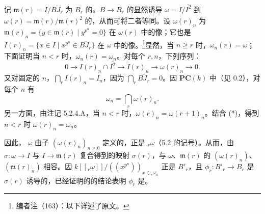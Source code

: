 记 $\mathfrak m(r)=I/\overline{BJ_r}$ 为 $B_r$ 的。$B\to B_r$ 的显然诱导 $\omega=I/\overline{I^2}$ 到 $\omega(r)=\mathfrak m(r)/\overline{\mathfrak m(r)^2}$ 的，从而可将二者等同。设 $\omega(r)_n$ 为 $\mathfrak m(r)_n=\{y\in\mathfrak m(r)\mid y^{p^n}=0\}$ 在 $\omega(r)$ 中的像；它也是
$I(r)_n=\{x\in I\mid x^{p^n}\in\overline{BJ_r}\}$ 在 $\omega$ 中的像。\footnote{编者注（163）：以下详述了原文。}显然，当 $n\geq r$ 时，$\omega_n(r)=\omega$；下面证明当 $n<r$ 时，$\omega_n(r)=\omega_n$。对每个 $r,n$，下列序列：
\[0\longrightarrow I(r)_n\cap\overline{I^2}\longrightarrow I(r)_n\longrightarrow\omega(r)_n\longrightarrow0.\]
又对固定的 $n$，$\bigcap_rI(r)_n=I_n$，因为 $\bigcap_r\overline{BJ_r}=0$。因 $\mathbf{PC}(k)$ 中（见 0.2），对每个 $n$ 有
\[\omega_n=\bigcap_r\omega(r)_n.\tag{*}\]
另一方面，由注记 5.2.4.A，当 $n<r$ 时，$\omega(r)_n=\omega(r+1)_n$。结合 (*)，得到 $n<r$ 时 $\omega(r)_n=\omega_n$。

因此， $\omega$ 由子 $(\omega(r)_n)_{n\geq0}$ 定义的，正是 ${}_r\omega$（5.2 的记号）。从而，由 $\sigma:\omega\to I$ 与 $I\to\mathfrak m(r)$ 复合得到的映射 $\sigma(r)$，与 $\omega$、$\mathfrak m(r)$ 的 $(\omega(r)_n)$、$(\mathfrak m(r)_n)$ 相容。因 $k[[{}_r\omega]]/((x^{p^n}))_{x\in{}_r\omega_n}$ 正是 $B'_r$，且 $\phi_r:B'_r\to B_r$ 是 $\sigma(r)$ 诱导的，已经证明的的结论表明 $\phi_r$ 是。

